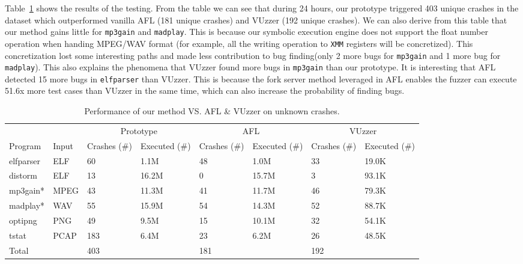 Table~\ref{zero-days} shows the results of the testing. 
From the table we can see that during 24 hours, our prototype triggered 403 unique crashes in the dataset which outperformed vanilla AFL (181 unique crashes) and VUzzer (192 unique crashes). 
We can also derive from this table that our method gains little for \texttt{mp3gain} and \texttt{madplay}. This is because our symbolic execution engine does not support the float number operation when handing MPEG/WAV format (for example, all the writing operation to \texttt{XMM} registers will be concretized). This concretization lost some interesting paths and made less contribution to bug finding(only 2 more bugs for \texttt{mp3gain} and 1 more bug for \texttt{madplay}). 
This also explains the phenomena that VUzzer found more bugs in \texttt{mp3gain} than our prototype. 
It is interesting that AFL detected 15 more bugs in \texttt{elfparser} than VUzzer. This is because the fork server method leveraged in AFL enables the fuzzer can execute 51.6x more test cases than VUzzer in the same time, which can also increase the probability of finding bugs.

\begin{table}
  \caption{\label{zero-days}Performance of our method VS. AFL \& VUzzer on unknown crashes.}
  \centering
	\begin{tabular}{l p{1.5cm}<{\centering} p{1.5cm}<{\centering} p{1.5cm}<{\centering} p{1.5cm}<{\centering} p{1.5cm}<{\centering} p{1.5cm}<{\centering} p{1.5cm}<{\centering}}
		\toprule
		& & \multicolumn{2}{c}{Prototype} & \multicolumn{2}{c}{AFL} & \multicolumn{2}{c}{VUzzer}\\
	    Program & Input & Crashes (\#) & Executed (\#)& Crashes (\#) & Executed (\#) & Crashes (\#) & Executed (\#)\\
		\midrule
		elfparser  & ELF	& 60 &   1.1M & 48   & 1.0M   & 33 & 19.0K    \\
		distorm    & ELF    & 13 &   16.2M   & 0   & 15.7M    & 3 & 93.1K    \\
		mp3gain*   & MPEG	& 43 &   11.3M  & 41  &  11.7M   & 46 &  79.3K  \\
		madplay*   & WAV	& 55 &   15.9M  & 54  & 14.3M    & 52 & 88.7K   \\
		optipng    & PNG    & 49 &   9.5M & 15  &  10.1M   & 32 & 54.1K   \\
		tstat      & PCAP   & 183&   6.4M & 23 &  6.2M   & 26 & 48.5K   \\
		\hline
		Total      &        & 403   &  & 181 &  & 192 &\\
	 \bottomrule
	\end{tabular}
\end{table}

